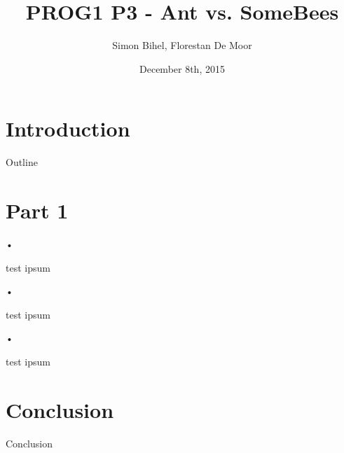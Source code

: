 \documentclass[11pt]{beamer}
\author{Simon Bihel, Florestan De Moor}
\institute{\texttt{[image: ens\_rennes]} }
\title{PROG1 P3 - Ant vs. SomeBees}
\date{December 8th, 2015}
\begin{document}
\begin{frame}
\titlepage
\end{frame}

\section*{Introduction}

\begin{frame}{Outline}
\tableofcontents
\end{frame}


\section*{Part 1}

\begin{frame}{•}
	\begin{block}{test}
	ipsum
	\end{block}
\end{frame}

\begin{frame}{•}
	\begin{exampleblock}{test}
	ipsum
	\end{exampleblock}
\end{frame}

\begin{frame}{•}
	\begin{alertblock}{test}
	ipsum
	\end{alertblock}
\end{frame}


\section*{Conclusion}

\begin{frame}{Conclusion}

\end{frame}

\begin{frame}{} %

\end{frame}
\end{document}
